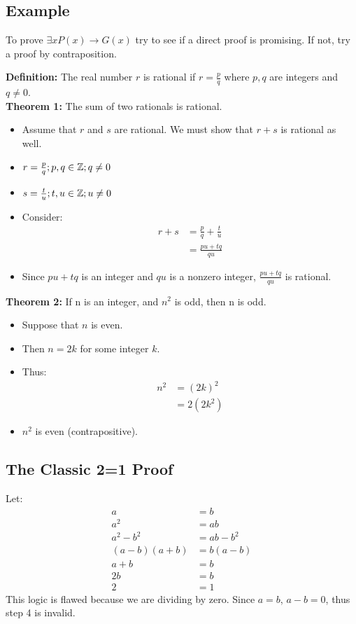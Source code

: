 \documentclass{math}
\begin{document}
\subsection*{Example}
To prove \( \exists{x}P(x) \to G(x) \) try to see if a direct proof is
promising. If not, try a proof by contraposition. \par
\textbf{Definition:} The real number \( r \) is rational if \( r = \frac{p}{q}
\) where \( p,q \) are integers and \( q \neq 0 \). \\
\textbf{Theorem 1:} The sum of two rationals is rational.
\begin{itemize}
  \item Assume that \( r \) and \( s \) are rational. We must show that
    \( r+s \) is rational as well.
  \item \( r = \frac{p}{q}; p,q \in \mathbb{Z}; q \neq 0 \)
  \item \( s = \frac{t}{u}; t,u \in \mathbb{Z}; u \neq 0 \)
  \item Consider:
    \begin{align*}
      r+s &= \frac{p}{q}+\frac{t}{u} \\
      &= \frac{pu+tq}{qu}
    \end{align*}
  \item Since \( pu+tq \) is an integer and \( qu \) is a nonzero integer,
    \( \frac{pu+tq}{qu} \) is rational.
\end{itemize}
\textbf{Theorem 2:} If n is an integer, and \( n^{2} \) is odd, then n is odd.
\begin{itemize}
  \item Suppose that \( n \) is even.
  \item Then \( n =2k \) for some integer \( k \).
  \item Thus:
    \begin{align*}
      n^{2} &= (2k)^{2} \\
      &= 2(2k^{2})
    \end{align*}
  \item \( n^{2} \) is even (contrapositive).
\end{itemize}

\subsection*{The Classic 2=1 Proof}
Let:
\begin{align*}
  a &= b \\
  a^{2} &= ab \\
  a^{2}-b^{2} &= ab-b^{2} \\
  (a-b)(a+b) &= b(a-b) \\
  a+b &= b \\
  2b &= b \\
  2 &= 1
\end{align*}
This logic is flawed because we are dividing by zero. Since \( a = b \),
\( a-b = 0 \), thus step 4 is invalid.
\end{document}
